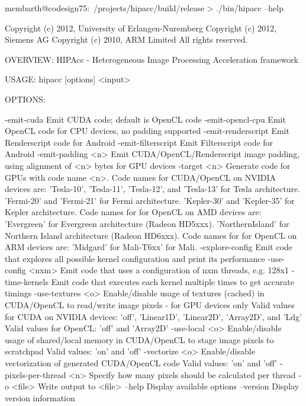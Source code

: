\lstset{language=bash}
\begin{code}
membarth@codesign75:~/projects/hipacc/build/release > ./bin/hipacc --help

Copyright (c) 2012, University of Erlangen-Nuremberg
Copyright (c) 2012, Siemens AG
Copyright (c) 2010, ARM Limited
All rights reserved.

OVERVIEW: HIPAcc - Heterogeneous Image Processing Acceleration framework

USAGE:  hipacc [options] <input>

OPTIONS:

  -emit-cuda              Emit CUDA code; default is OpenCL code
  -emit-opencl-cpu        Emit OpenCL code for CPU devices, no padding supported
  -emit-renderscript      Emit Renderscript code for Android
  -emit-filterscript      Emit Filterscript code for Android
  -emit-padding <n>       Emit CUDA/OpenCL/Renderscript image padding, using alignment of <n> bytes for GPU devices
  -target <n>             Generate code for GPUs with code name <n>.
                          Code names for CUDA/OpenCL on NVIDIA devices are:
                            'Tesla-10', 'Tesla-11', 'Tesla-12', and 'Tesla-13' for Tesla architecture.
                            'Fermi-20' and 'Fermi-21' for Fermi architecture.
                            'Kepler-30' and 'Kepler-35' for Kepler architecture.
                          Code names for for OpenCL on AMD devices are:
                            'Evergreen'      for Evergreen architecture (Radeon HD5xxx).
                            'NorthernIsland' for Northern Island architecture (Radeon HD6xxx).
                          Code names for for OpenCL on ARM devices are:
                            'Midgard' for Mali-T6xx' for Mali.
  -explore-config         Emit code that explores all possible kernel configuration and print its performance
  -use-config <nxm>       Emit code that uses a configuration of nxm threads, e.g. 128x1
  -time-kernels           Emit code that executes each kernel multiple times to get accurate timings
  -use-textures <o>       Enable/disable usage of textures (cached) in CUDA/OpenCL to read/write image pixels - for GPU devices only
                          Valid values for CUDA on NVIDIA devices: 'off', 'Linear1D', 'Linear2D', 'Array2D', and 'Ldg'
                          Valid values for OpenCL: 'off' and 'Array2D'
  -use-local <o>          Enable/disable usage of shared/local memory in CUDA/OpenCL to stage image pixels to scratchpad
                          Valid values: 'on' and 'off'
  -vectorize <o>          Enable/disable vectorization of generated CUDA/OpenCL code
                          Valid values: 'on' and 'off'
  -pixels-per-thread <n>  Specify how many pixels should be calculated per thread
  -o <file>               Write output to <file>
  --help                  Display available options
  --version               Display version information
\end{code}


